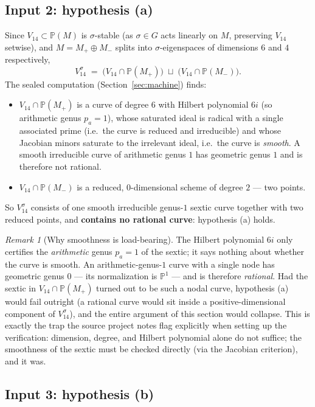 \documentclass[11pt]{article}
\theoremstyle{plain}
\theoremstyle{definition}
\theoremstyle{remark}
\newtheorem{remark}[theorem]{Remark}
\newcommand{\PP}{\mathbb P}
\begin{document}
\subsection{Input 2: hypothesis (a)}

Since $V_{14}\subset\PP(M)$ is $\sigma$-stable (as $\sigma\in G$ acts
linearly on $M$, preserving $V_{14}$ setwise), and $M=M_+\oplus M_-$
splits into $\sigma$-eigenspaces of dimensions $6$ and $4$ respectively,
\[
V_{14}^\sigma \;=\; \bigl(V_{14}\cap\PP(M_+)\bigr) \;\sqcup\;
\bigl(V_{14}\cap\PP(M_-)\bigr).
\]
The sealed computation (Section~\ref{sec:machine}) finds:
\begin{itemize}
\item $V_{14}\cap\PP(M_+)$ is a curve of degree $6$ with Hilbert
polynomial $6i$ (so arithmetic genus $p_a=1$), whose saturated ideal is
radical with a single associated prime (i.e.\ the curve is reduced and
irreducible) and whose Jacobian minors saturate to the irrelevant
ideal, i.e.\ the curve is \emph{smooth}. A smooth irreducible curve of
arithmetic genus $1$ has geometric genus $1$ and is therefore not
rational.
\item $V_{14}\cap\PP(M_-)$ is a reduced, $0$-dimensional scheme of
degree $2$ --- two points.
\end{itemize}
So $V_{14}^\sigma$ consists of one smooth irreducible genus-$1$ sextic
curve together with two reduced points, and \textbf{contains no
rational curve}: hypothesis (a) holds.

\begin{remark}[Why smoothness is load-bearing]
The Hilbert polynomial $6i$ only certifies the \emph{arithmetic} genus
$p_a=1$ of the sextic; it says nothing about whether the curve is
smooth. An arithmetic-genus-$1$ curve with a single node has geometric
genus $0$ --- its normalization is $\PP^1$ --- and is therefore
\emph{rational}. Had the sextic in $V_{14}\cap\PP(M_+)$ turned out to
be such a nodal curve, hypothesis (a) would fail outright (a rational
curve would sit inside a positive-dimensional component of $V_{14}^
\sigma$), and the entire argument of this section would collapse. This
is exactly the trap the source project notes flag explicitly when
setting up the verification: dimension, degree, and Hilbert polynomial
alone do not suffice; the smoothness of the sextic must be checked
directly (via the Jacobian criterion), and it was.
\end{remark}

\subsection{Input 3: hypothesis (b)}
\end{document}
